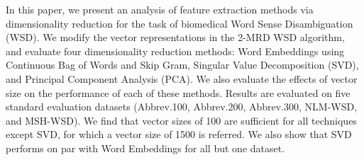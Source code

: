 In this paper, we present an analysis of feature extraction methods via dimensionality reduction for the task of biomedical Word Sense Disambiguation (WSD). We modify the vector representations in the 2-MRD WSD algorithm, and evaluate four dimensionality reduction methods: Word Embeddings using Continuous Bag of Words and Skip Gram, Singular Value Decomposition (SVD), and Principal Component Analysis (PCA). We also evaluate the effects of vector size on the performance of each of these methods. Results are evaluated on five standard evaluation datasets (Abbrev.100, Abbrev.200, Abbrev.300, NLM-WSD, and MSH-WSD). We find that vector sizes of 100 are sufficient for all techniques except SVD, for which a vector size of 1500 is referred. We also show that SVD performs on par with Word Embeddings for all but one dataset.
